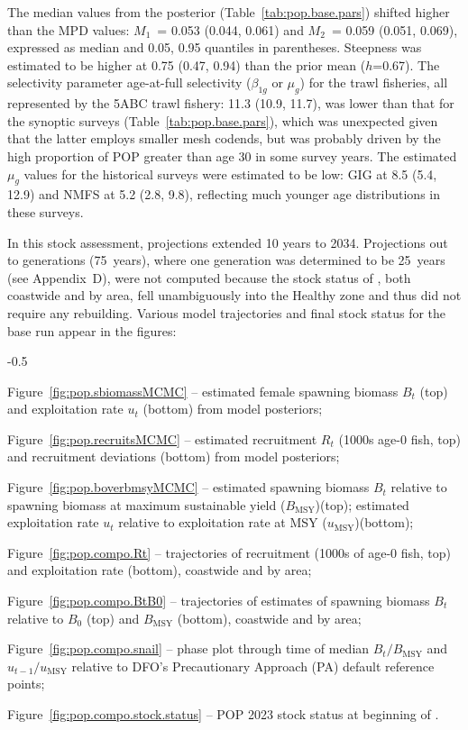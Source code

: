 \documentclass[11pt]{book}
\newcommand{\Bmsy}{B_\text{MSY}}
\newcommand{\umsy}{u_\text{MSY}}
\begin{document}
The median values from the posterior (Table~\ref{tab:pop.base.pars}) shifted higher than the MPD values: $M_1$~= 0.053 (0.044, 0.061) and $M_2$~= 0.059 (0.051, 0.069), expressed as median and 0.05, 0.95 quantiles in parentheses. 
Steepness was estimated to be higher at 0.75 (0.47, 0.94) than the prior mean ($h$=0.67).
The selectivity parameter age-at-full selectivity ($\beta_{1g}$ or $\mu_g$) for the trawl fisheries, all represented by the 5ABC trawl fishery: 11.3 (10.9, 11.7), was lower than that for the synoptic surveys (Table~\ref{tab:pop.base.pars}), which was unexpected given that the latter employs smaller mesh codends, but was probably driven by the high proportion of POP greater than age 30 in some survey years. 
The estimated $\mu_g$ values for the historical surveys were estimated to be low: GIG at 8.5 (5.4, 12.9) and NMFS at 5.2 (2.8, 9.8), reflecting much younger age distributions in these surveys. 



In this stock assessment, projections extended 10 years to 2034. 
Projections out to  generations (75~years), where one generation was determined to be 25~years (see Appendix~D), were not computed because the stock status of \SPC{}, both coastwide and by area, fell unambiguously into the Healthy zone and thus did not require any rebuilding.
Various model trajectories and final stock status for the base run appear in the figures:
\begin{itemize_csas}{-0.5}{}
	\item Figure~\ref{fig:pop.sbiomassMCMC}    -- estimated female spawning biomass $B_t$ (top) and exploitation rate $u_t$ (bottom) from model posteriors;
	\item Figure~\ref{fig:pop.recruitsMCMC}      -- estimated recruitment $R_t$ (1000s age-0 fish, top) and recruitment deviations (bottom) from model posteriors;
	\item Figure~\ref{fig:pop.boverbmsyMCMC} -- estimated spawning biomass $B_t$ relative to spawning biomass at maximum sustainable yield ($\Bmsy$)(top); estimated exploitation rate $u_t$ relative to exploitation rate at MSY ($\umsy$)(bottom);
	\item Figure~\ref{fig:pop.compo.Rt} -- trajectories of recruitment (1000s of age-0 fish, top) and exploitation rate (bottom), coastwide and by area;
	\item Figure~\ref{fig:pop.compo.BtB0} -- trajectories of estimates of spawning biomass $B_t$ relative to $B_0$ (top) and $\Bmsy$ (bottom), coastwide and by area;
	\item Figure~\ref{fig:pop.compo.snail}  -- phase plot through time of median $B_t/\Bmsy$ and $u_{t-1}/\umsy$ relative to DFO's Precautionary Approach (PA) default reference points;
	\item Figure~\ref{fig:pop.compo.stock.status} -- POP 2023 stock status at beginning of \currYear{}.
\end{itemize_csas}
\end{document}
